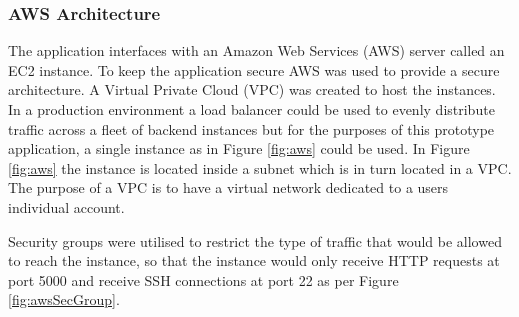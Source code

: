 \tocless\subsubsection{AWS Architecture}
The application interfaces with an Amazon Web Services (AWS) server called an EC2 instance.
To keep the application secure AWS was used to provide a secure architecture.
A Virtual Private Cloud (VPC) was created to host the instances.
In a production environment a load balancer could be used to evenly distribute traffic across a fleet of backend instances but for the purposes of this prototype application, a single instance as in Figure \ref{fig:aws} could be used.
In Figure \ref{fig:aws} the instance is located inside a subnet which is in turn located in a VPC.
The purpose of a VPC is to have a virtual network dedicated to a users individual account. 

Security groups were utilised to restrict the type of traffic that would be allowed to reach the instance, so that the instance would only receive HTTP requests at port 5000 and receive SSH connections at port 22 as per Figure \ref{fig:awsSecGroup}.


\clearpage